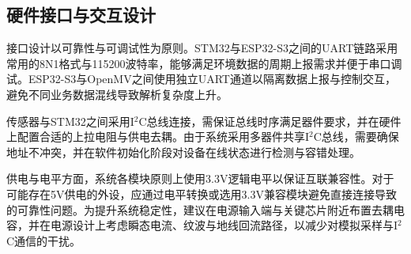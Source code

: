 \subsection{硬件接口与交互设计}
\par 接口设计以可靠性与可调试性为原则。STM32与ESP32-S3之间的UART链路采用常用的8N1格式与115200波特率，能够满足环境数据的周期上报需求并便于串口调试。ESP32-S3与OpenMV之间使用独立UART通道以隔离数据上报与控制交互，避免不同业务数据混线导致解析复杂度上升。
\par 传感器与STM32之间采用I\(^2\)C总线连接，需保证总线时序满足器件要求，并在硬件上配置合适的上拉电阻与供电去耦。由于系统采用多器件共享I\(^2\)C总线，需要确保地址不冲突，并在软件初始化阶段对设备在线状态进行检测与容错处理。
\par 供电与电平方面，系统各模块原则上使用3.3V逻辑电平以保证互联兼容性。对于可能存在5V供电的外设，应通过电平转换或选用3.3V兼容模块避免直接连接导致的可靠性问题。为提升系统稳定性，建议在电源输入端与关键芯片附近布置去耦电容，并在电源设计上考虑瞬态电流、纹波与地线回流路径，以减少对模拟采样与I\(^2\)C通信的干扰。
